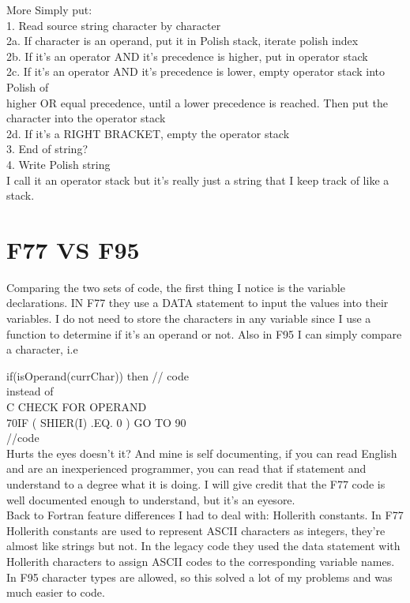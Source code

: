 \documentclass[a4paper,12pt]{article}
\begin{document}
More Simply put:\\
1. Read source string character by character\\
2a. If character is an operand, put it in Polish stack, iterate polish index\\
2b. If it's an operator AND it's precedence is higher, put in operator stack\\
2c. If it's an operator AND it's precedence is lower, empty operator stack into Polish of \\
higher OR equal precedence, until a lower precedence is reached. Then put the character into the operator stack\\
2d. If it's a RIGHT BRACKET, empty the operator stack\\
3. End of string?\\
4. Write Polish string\\

\hspace{.5cm}I call it an operator stack but it's really just a string that I keep track of like a stack.
\section{F77 VS F95}

Comparing the two sets of code, the first thing I notice is the variable declarations. IN F77 they use a DATA statement to input the values into their variables. I do not need to store the characters in any variable since I use a function to determine if it's an operand or not. Also in F95 I can simply compare a character, i.e

\hspace{20 mm}if(isOperand(currChar)) then
\hspace{10 mm}// code \\
	 instead of \\
C\hspace{10 mm} CHECK FOR OPERAND\\
70\hspace{10 mm}IF ( SHIER(I) .EQ. 0 ) GO TO 90\\
\hspace{20 mm} //code
\\
\hspace{10 mm} Hurts the eyes doesn't it? And mine is self documenting, if you can read English and are an inexperienced programmer, you can read that if statement and understand to a degree what it is doing. I will give credit that the F77 code is well documented enough to understand, but it's an eyesore.\\
\hspace{10 mm} Back to Fortran feature differences I had to deal with: Hollerith constants. In F77 Hollerith constants are used to represent ASCII characters as integers, they're almost like strings but not. In the legacy code they used the data statement with Hollerith characters to assign ASCII codes to the corresponding variable names. In F95 character types are allowed, so this solved a lot of my problems and was much easier to code.
	
\end{document}
